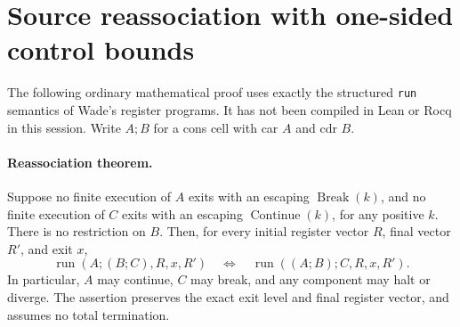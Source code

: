 \section{Source reassociation with one-sided control bounds}
\label{sec:generalized-associativity}

The following ordinary mathematical proof uses exactly the structured
\texttt{run} semantics of Wade's register programs. It has not been
compiled in Lean or Rocq in this session.
Write $A;B$ for a cons cell with car $A$ and cdr $B$.

\paragraph{Reassociation theorem.}
Suppose no finite execution of $A$ exits with an escaping
$\operatorname{Break}(k)$, and no finite execution of $C$ exits with an
escaping $\operatorname{Continue}(k)$, for any positive $k$.
There is no restriction on $B$. Then, for every initial register vector
$R$, final vector $R'$, and exit $x$,
\[
 \operatorname{run}(A;(B;C),R,x,R')
 \quad\Longleftrightarrow\quad
 \operatorname{run}((A;B);C,R,x,R').
\]
In particular, $A$ may continue, $C$ may break, and any component may halt
or diverge. The assertion preserves the exact exit level and final
register vector, and assumes no total termination.

